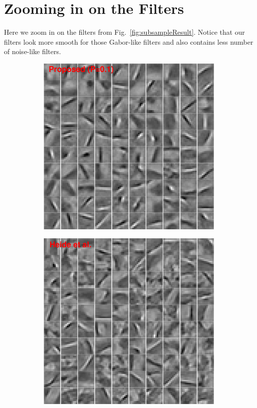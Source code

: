 \section{Zooming in on the Filters}

Here we zoom in on the filters from Fig.\ \ref{fig:subsampleResult}. Notice that our filters look more smooth for those Gabor-like filters and also contains less number of noise-like filters.

\begin{figure}[h]
\centering
\begin{subfigure}{0.49\textwidth}
  \includegraphics[width=1\linewidth]{figure/batchFruit100.pdf}
  \vspace{0.1cm}
\end{subfigure}
\begin{subfigure}{0.49\textwidth}
  \includegraphics[width=1\linewidth]{figure/heideFruit100.pdf}

\end{subfigure}
\end{figure}
